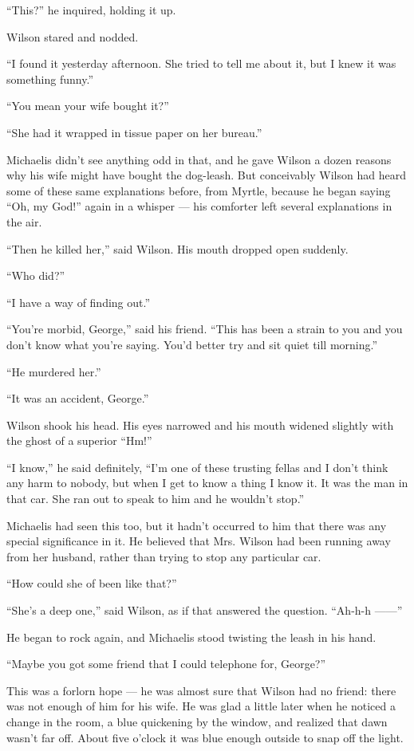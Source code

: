 \documentclass{znotebook}
\begin{document}
``This?'' he inquired, holding it up.

Wilson stared and nodded.

``I found it yesterday afternoon. She tried to tell me about it, but I knew it was something funny.''

``You mean your wife bought it?''

``She had it wrapped in tissue paper on her bureau.''

Michaelis didn’t see anything odd in that, and he gave Wilson a dozen reasons why his wife might have bought the dog-leash. But conceivably Wilson had heard some of these same explanations before, from Myrtle, because he began saying ``Oh, my God!'' again in a whisper — his comforter left several explanations in the air.

``Then he killed her,'' said Wilson. His mouth dropped open suddenly.

``Who did?''

``I have a way of finding out.''

``You’re morbid, George,'' said his friend. ``This has been a strain to you and you don’t know what you’re saying. You’d better try and sit quiet till morning.''

``He murdered her.''

``It was an accident, George.''

Wilson shook his head. His eyes narrowed and his mouth widened slightly with the ghost of a superior ``Hm!''

``I know,'' he said definitely, ``I’m one of these trusting fellas and I don’t think any harm to nobody, but when I get to know a thing I know it. It was the man in that car. She ran out to speak to him and he wouldn’t stop.''

Michaelis had seen this too, but it hadn’t occurred to him that there was any special significance in it. He believed that Mrs. Wilson had been running away from her husband, rather than trying to stop any particular car.

``How could she of been like that?''

``She’s a deep one,'' said Wilson, as if that answered the question. ``Ah-h-h ——''

He began to rock again, and Michaelis stood twisting the leash in his hand.

``Maybe you got some friend that I could telephone for, George?''

This was a forlorn hope — he was almost sure that Wilson had no friend: there was not enough of him for his wife. He was glad a little later when he noticed a change in the room, a blue quickening by the window, and realized that dawn wasn’t far off. About five o’clock it was blue enough outside to snap off the light.
\end{document}
